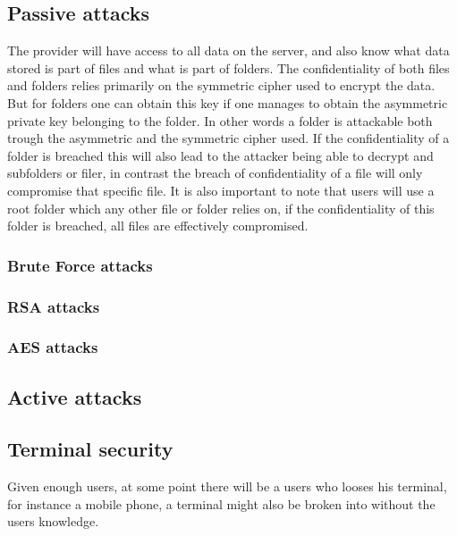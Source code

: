 \documentclass[pdftex,english,10pt,b5paper,twoside]{book}
\begin{document}
\subsection{Passive attacks}
The provider will have access to all data on the server, and also know what
data stored is part of files and what is part of folders. The confidentiality
of both files and folders relies primarily on the symmetric cipher used to
encrypt the data. But for folders one can obtain this key if one manages to
obtain the asymmetric private key belonging to the folder. In other words a
folder is attackable both trough the asymmetric and the symmetric cipher used.
If the confidentiality of a folder is breached this will also lead to the
attacker being able to decrypt and subfolders or filer, in contrast the breach
of confidentiality of a file will only compromise that specific file. It is
also important to note that users will use a root folder which any other file
or folder relies on, if the confidentiality of this folder is breached, all
files are effectively compromised.

\subsubsection{Brute Force attacks}

\subsubsection{RSA attacks}

\subsubsection{AES attacks}

\subsection{Active attacks}


\subsection{Terminal security}
Given enough users, at some point there will be a users who looses his
terminal, for instance a mobile phone, a terminal might also be broken into
without the users knowledge.
\end{document}
